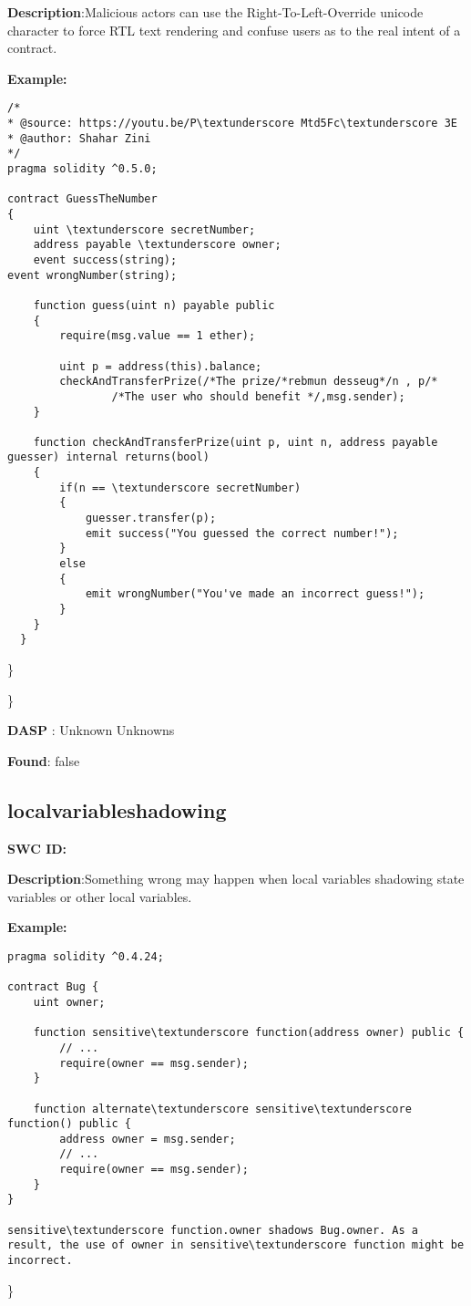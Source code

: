 \documentclass{article}
\begin{document}
\textbf{Description}:Malicious actors can use the Right-To-Left-Override unicode character to force RTL text rendering and confuse users as to the real intent of a contract.


\textbf{Example:} 
\begin{verbatim}
/*
* @source: https://youtu.be/P\textunderscore Mtd5Fc\textunderscore 3E
* @author: Shahar Zini
*/
pragma solidity ^0.5.0;

contract GuessTheNumber
{
    uint \textunderscore secretNumber;
    address payable \textunderscore owner;
    event success(string);
event wrongNumber(string);

    function guess(uint n) payable public
    {
        require(msg.value == 1 ether);

        uint p = address(this).balance;
        checkAndTransferPrize(/*The prize/*rebmun desseug*/n , p/*
                /*The user who should benefit */,msg.sender);
    }

    function checkAndTransferPrize(uint p, uint n, address payable guesser) internal returns(bool)
    {
        if(n == \textunderscore secretNumber)
        {
            guesser.transfer(p);
            emit success("You guessed the correct number!");
        }
        else
        {
            emit wrongNumber("You've made an incorrect guess!");
        }
    }
  }

\end{verbatim}\} 

\} 

\textbf{DASP} : Unknown Unknowns

\textbf{Found}: false

\subsection{local\textunderscore variable\textunderscore shadowing} 
\textbf{SWC \textunderscore ID:} 

\textbf{Description}:Something wrong may happen when local variables shadowing state variables or other local variables.


\textbf{Example:} 
\begin{verbatim}
pragma solidity ^0.4.24;

contract Bug {
    uint owner;

    function sensitive\textunderscore function(address owner) public {
        // ...
        require(owner == msg.sender);
    }

    function alternate\textunderscore sensitive\textunderscore function() public {
        address owner = msg.sender;
        // ...
        require(owner == msg.sender);
    }
}

sensitive\textunderscore function.owner shadows Bug.owner. As a result, the use of owner in sensitive\textunderscore function might be incorrect.

\end{verbatim}\} 
\end{document}
